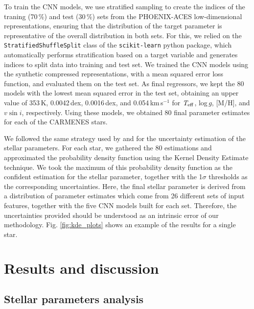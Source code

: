 To train the CNN models, we use stratified sampling to create the indices of the traning (70\,\%) and test (30\,\%) sets from the PHOENIX-ACES low-dimensional representations, ensuring that the distribution of the target parameter is representative of the overall distribution in both sets. For this, we relied on the \texttt{StratifiedShuffleSplit} class of the \texttt{scikit-learn} python package, which automatically performs stratification based on a target variable and generates indices to split data into training and test set. We trained the CNN models using the synthetic compressed representations, with a mean squared error loss function, and evaluated them on the test set. As final regressors, we kept the 80 models with the lowest mean squared error in the test set, obtaining an upper value of 353\,K, 0.0042\,dex, 0.0016\,dex, and 0.054\,km\,s$^{-1}$ for $\textit{T}_{\rm eff}$, log\,$\textit{g}$, [M/H], and $\textit{v}\sin{i}$, respectively. Using these models, we obtained 80 final parameter estimates for each of the CARMENES stars.

We followed the same strategy used by  and  for the uncertainty estimation of the stellar parameters. For each star, we gathered the 80 estimations and approximated the probability density function using the Kernel Density Estimate \citep[KDE; ][]{chen1997, poggio2021} technique. We took the maximum of this probability density function as the confident estimation for the stellar parameter, together with the 1$\sigma$ thresholds as the corresponding uncertainties. Here, the final stellar parameter is derived from a distribution of parameter estimates which come from 26 different sets of input features, together with the five CNN models built for each set. Therefore, the uncertainties provided should be understood as an intrinsic error of our methodology. Fig. \ref{fig:kde_plots} shows an example of the results for a single star.




\section{Results and discussion} \label{acs_sec:results}

\subsection{Stellar parameters analysis} \label{acs_sec:par_analysis}


